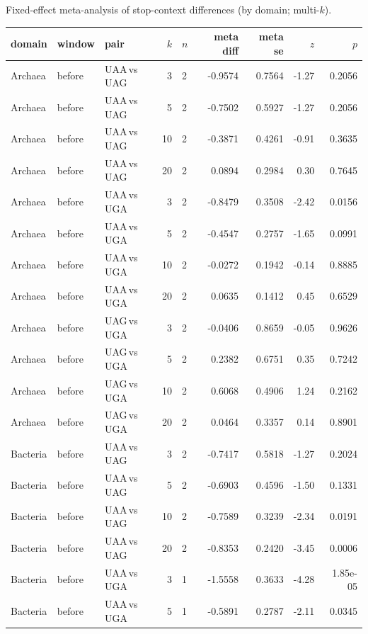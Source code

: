 Fixed-effect meta-analysis of stop-context differences (by domain; multi-$k$).

\begingroup
{}
\scriptsize
\setlength{\tabcolsep}{4pt}
\renewcommand{\arraystretch}{1.10}
\setlength{\LTleft}{0pt}
\setlength{\LTright}{0pt}
\begin{longtable}{lllrlrrrr}
\toprule
domain & window & pair & $k$ & $n$ & meta diff & meta se & $z$ & $p$ \\
\midrule
Archaea & before & UAA$\,$vs$\,$UAG & 3 & 2 & -0.9574 & 0.7564 & -1.27 & 0.2056 \\
Archaea & before & UAA$\,$vs$\,$UAG & 5 & 2 & -0.7502 & 0.5927 & -1.27 & 0.2056 \\
Archaea & before & UAA$\,$vs$\,$UAG & 10 & 2 & -0.3871 & 0.4261 & -0.91 & 0.3635 \\
Archaea & before & UAA$\,$vs$\,$UAG & 20 & 2 & 0.0894 & 0.2984 & 0.30 & 0.7645 \\
Archaea & before & UAA$\,$vs$\,$UGA & 3 & 2 & -0.8479 & 0.3508 & -2.42 & 0.0156 \\
Archaea & before & UAA$\,$vs$\,$UGA & 5 & 2 & -0.4547 & 0.2757 & -1.65 & 0.0991 \\
Archaea & before & UAA$\,$vs$\,$UGA & 10 & 2 & -0.0272 & 0.1942 & -0.14 & 0.8885 \\
Archaea & before & UAA$\,$vs$\,$UGA & 20 & 2 & 0.0635 & 0.1412 & 0.45 & 0.6529 \\
Archaea & before & UAG$\,$vs$\,$UGA & 3 & 2 & -0.0406 & 0.8659 & -0.05 & 0.9626 \\
Archaea & before & UAG$\,$vs$\,$UGA & 5 & 2 & 0.2382 & 0.6751 & 0.35 & 0.7242 \\
Archaea & before & UAG$\,$vs$\,$UGA & 10 & 2 & 0.6068 & 0.4906 & 1.24 & 0.2162 \\
Archaea & before & UAG$\,$vs$\,$UGA & 20 & 2 & 0.0464 & 0.3357 & 0.14 & 0.8901 \\
Bacteria & before & UAA$\,$vs$\,$UAG & 3 & 2 & -0.7417 & 0.5818 & -1.27 & 0.2024 \\
Bacteria & before & UAA$\,$vs$\,$UAG & 5 & 2 & -0.6903 & 0.4596 & -1.50 & 0.1331 \\
Bacteria & before & UAA$\,$vs$\,$UAG & 10 & 2 & -0.7589 & 0.3239 & -2.34 & 0.0191 \\
Bacteria & before & UAA$\,$vs$\,$UAG & 20 & 2 & -0.8353 & 0.2420 & -3.45 & 0.0006 \\
Bacteria & before & UAA$\,$vs$\,$UGA & 3 & 1 & -1.5558 & 0.3633 & -4.28 & 1.85e-05 \\
Bacteria & before & UAA$\,$vs$\,$UGA & 5 & 1 & -0.5891 & 0.2787 & -2.11 & 0.0345 \\

\end{longtable}
